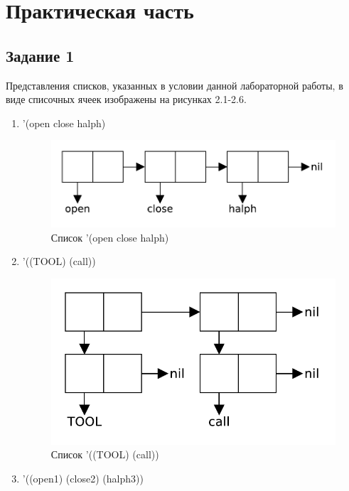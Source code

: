 \chapter{Практическая часть}

\section{Задание \No{}1}
Представления списков, указанных в условии данной лабораторной работы, в виде списочных ячеек изображены на рисунках 2.1-2.6.

\begin{enumerate}
    \item '(open close halph)
        \begin{figure}[H]
            \centering
            \includegraphics[scale=0.60]{data/pdf/01-01.pdf}
            \caption{Список '(open close halph)}
        \end{figure}
    \item '((TOOL) (call))
        \begin{figure}[H]
            \centering
            \includegraphics[scale=0.60]{data/pdf/01-02.pdf}
            \caption{Список '((TOOL) (call))}
        \end{figure}
    \item '((open1) (close2) (halph3))
        \begin{figure}[H]

\end{figure}
\end{enumerate}
